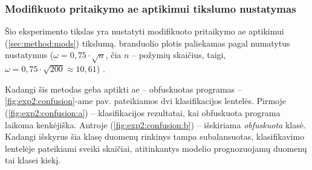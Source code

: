 \subsubsection{Modifikuoto \LIME pritaikymo \gls{ae} aptikimui tikslumo nustatymas}

Šio eksperimento tikslas yra nustatyti modifikuoto \LIME pritaikymo \gls{ae} aptikimui (\ref{sec:method:mods}) tikslumą. \LIME branduolio plotis paliekamas pagal numatytus nustatymus ($\omega = 0,75 \cdot \sqrt{n}$, čia $n$ -- požymių skaičius, taigi, $\omega = 0,75 \cdot \sqrt{200} \approx 10,61$) \cite{ribeiroWhyShouldTrust2016}.

Kadangi šis metodas geba aptikti \gls{ae} -- obfuskuotas programas --
\ref{fig:exp2:confusion}-ame pav. pateikiamos dvi klasifikacijos lentelės. Pirmoje (\ref{fig:exp2:confusion:a}) -- klasifikacijos rezultatai, kai obfuskuota programa laikoma kenkėjiška. Antroje (\ref{fig:exp2:confusion:b}) -- išskiriama \textit{obfuskuota} klasė. Kadangi išskyrus šia klasę duomenų rinkinys tampa subalansuotas, klasifikavimo lentelėje pateikiami sveiki skaičiai, atitinkantys modelio prognozuojamų duomenų tai klasei kiekį.

